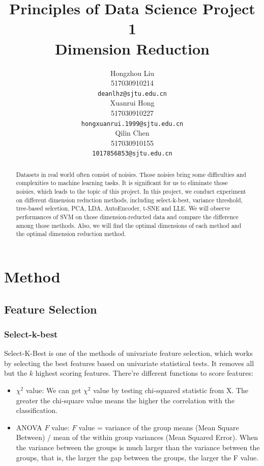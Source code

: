 \documentclass{article}
\title{Principles of Data Science Project 1\\
        Dimension Reduction}
\author{
  Hongzhou Liu \\
  517030910214 \\
  \texttt{deanlhz@sjtu.edu.cn} \\
  \And
  Xuanrui Hong \\
  517030910227 \\
  \texttt{hongxuanrui.1999@sjtu.edu.cn} \\
  \And
  Qilin Chen \\
  517030910155 \\
  \texttt{1017856853@sjtu.edu.cn} \\
}
\begin{document}


\maketitle

\begin{abstract}
\indent Datasets in real world often consist of noisies. Those noisies bring some difficulties and complexities to machine learning tasks. It is significant for us to eliminate those noisies, which leads to the topic of this project.
In this project, we conduct experiment on different dimension reduction methods, including select-k-best, variance threshold, tree-based selcetion, PCA, LDA, AutoEncoder, t-SNE and LLE.
We will observe performances of SVM on those dimension-reducted data and compare the difference among those methods. Also, we will find the optimal dimensions of each method and the optimal dimension reduction method.
\end{abstract}

\section{Method}
\subsection{Feature Selection}
\subsubsection{Select-k-best}
\indent Select-K-Best is one of the methods of univariate feature selection, which works by selecting the best features based on univariate statistical tests. It removes all but the $k$ highest scoring features. There're different functions to score features:
\begin{itemize}
	\item $\chi^2$ value: We can get $\chi^2$ value by testing chi-squared statistic from X.
	The greater the chi-square value means the higher the correlation with the classification.
	
	\item ANOVA $F$ value: $F$ value = variance of the group means (Mean Square Between) / mean of the within group variances (Mean Squared Error).
	When the variance between the groups is much larger than the variance between the groups, that is, the larger the gap between the groups, the larger the F value.
\end{itemize}
\end{document}
